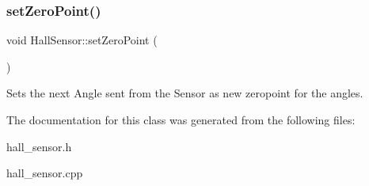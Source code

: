 \subsubsection{\texorpdfstring{set\+Zero\+Point()}{setZeroPoint()}}
{\footnotesize\ttfamily void Hall\+Sensor\+::set\+Zero\+Point (\begin{DoxyParamCaption}{ }\end{DoxyParamCaption})}

Sets the next Angle sent from the Sensor as new zeropoint for the angles. 

The documentation for this class was generated from the following files\+:\begin{DoxyCompactItemize}
\item 
hall\+\_\+sensor.\+h\item 
hall\+\_\+sensor.\+cpp\end{DoxyCompactItemize}
